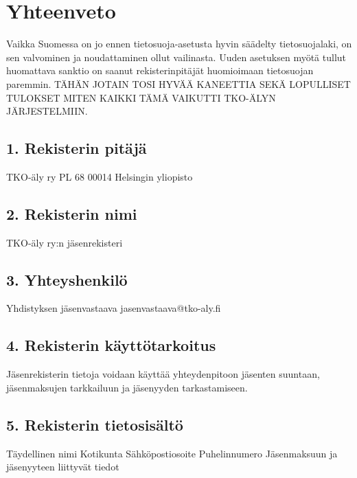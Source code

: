 \documentclass[finnish]{tktltiki}
\begin{document}
\section{Yhteenveto}
Vaikka Suomessa on jo ennen tietosuoja-asetusta hyvin säädelty tietosuojalaki, on sen valvominen ja noudattaminen ollut vailinasta. Uuden asetuksen myötä tullut huomattava sanktio on saanut rekisterinpitäjät huomioimaan tietosuojan paremmin. TÄHÄN JOTAIN TOSI HYVÄÄ KANEETTIA SEKÄ LOPULLISET TULOKSET MITEN KAIKKI TÄMÄ VAIKUTTI TKO-ÄLYN JÄRJESTELMIIN.


\newpage
\nocite{*}
%

%

%



\lastpage

\appendices

\pagestyle{empty}


\subsection*{1. Rekisterin pitäjä}
TKO-äly ry
PL 68
00014 Helsingin yliopisto

\subsection*{2. Rekisterin nimi}
TKO-äly ry:n jäsenrekisteri

\subsection*{3. Yhteyshenkilö}
Yhdistyksen jäsenvastaava
jasenvastaava@tko-aly.fi

\subsection*{4. Rekisterin käyttötarkoitus}
Jäsenrekisterin tietoja voidaan käyttää yhteydenpitoon jäsenten suuntaan, jäsenmaksujen tarkkailuun ja jäsenyyden tarkastamiseen.

\subsection*{5. Rekisterin tietosisältö}
Täydellinen nimi
Kotikunta
Sähköpostiosoite
Puhelinnumero
Jäsenmaksuun ja jäsenyyteen liittyvät tiedot
\end{document}
